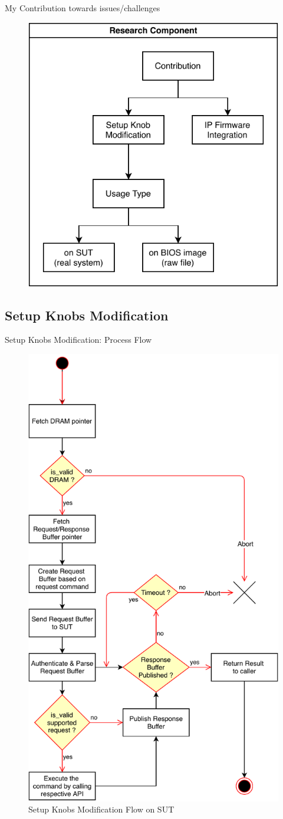 
\begin{frame}{My Contribution towards issues/challenges}
  \begin{figure}
    \centering
    \includegraphics[width=\textwidth]{Im/figures/research-component}
  \end{figure}
\end{frame}

\subsection{Setup Knobs Modification}
\begin{frame}[allowframebreaks]{Setup Knobs Modification: Process Flow}
  \begin{figure}[htbp]
    \centering
    \includegraphics[width=0.3\linewidth]{Im/figures/setup-knobs-flow}
    \caption{Setup Knobs Modification Flow on SUT}
    \label{fig:setup-knobs-flow}
  \end{figure}
\end{frame}

